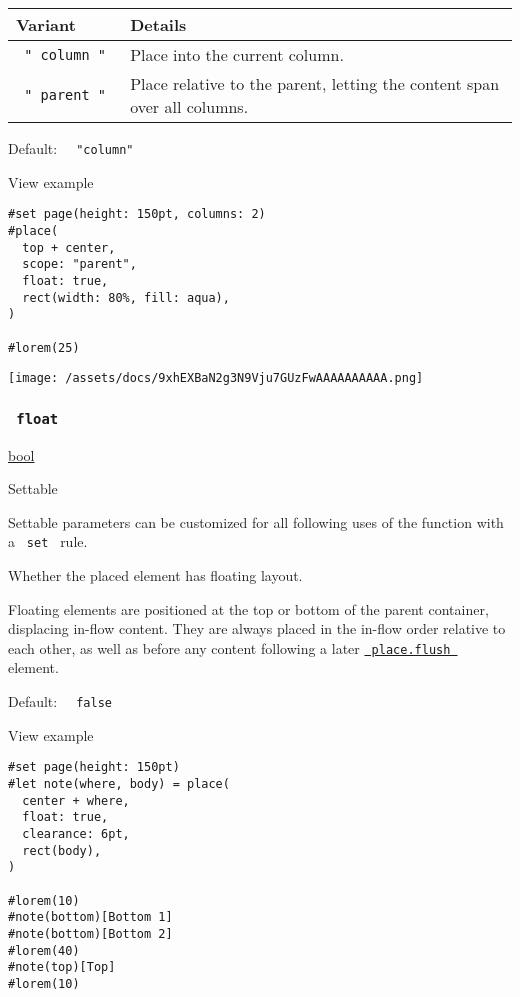 \begin{longtable}[]{@{}ll@{}}
\toprule\noalign{}
Variant & Details \\
\midrule\noalign{}
\endhead
\bottomrule\noalign{}
\endlastfoot
\texttt{\ "\ column\ "\ } & Place into the current column. \\
\texttt{\ "\ parent\ "\ } & Place relative to the parent, letting the
content span over all columns. \\
\end{longtable}

Default: \texttt{\ }{\texttt{\ "column"\ }}\texttt{\ }


View example

\begin{verbatim}
#set page(height: 150pt, columns: 2)
#place(
  top + center,
  scope: "parent",
  float: true,
  rect(width: 80%, fill: aqua),
)

#lorem(25)
\end{verbatim}

\texttt{[image: /assets/docs/9xhEXBaN2g3N9Vju7GUzFwAAAAAAAAAA.png]}

\subsubsection{\texorpdfstring{\texttt{\ float\ }}{ float }}\label{parameters-float}

\href{/docs/reference/foundations/bool/}{bool}

{{ Settable }}

\label{parameters-float-settable-tooltip}
Settable parameters can be customized for all following uses of the
function with a \texttt{\ set\ } rule.

Whether the placed element has floating layout.

Floating elements are positioned at the top or bottom of the parent
container, displacing in-flow content. They are always placed in the
in-flow order relative to each other, as well as before any content
following a later
\href{/docs/reference/layout/place/\#definitions-flush}{\texttt{\ place.flush\ }}
element.

Default: \texttt{\ }{\texttt{\ false\ }}\texttt{\ }


View example

\begin{verbatim}
#set page(height: 150pt)
#let note(where, body) = place(
  center + where,
  float: true,
  clearance: 6pt,
  rect(body),
)

#lorem(10)
#note(bottom)[Bottom 1]
#note(bottom)[Bottom 2]
#lorem(40)
#note(top)[Top]
#lorem(10)
\end{verbatim}

